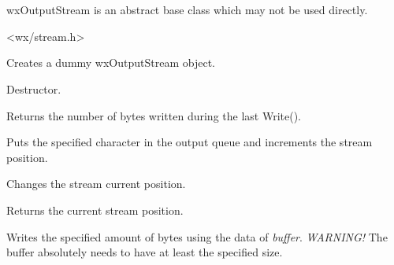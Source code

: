 \section{}\label{wxoutputstream}

wxOutputStream is an abstract base class which may not be used directly.




<wx/stream.h>



Creates a dummy wxOutputStream object.



Destructor.



Returns the number of bytes written during the last Write().



Puts the specified character in the output queue and increments the
stream position.



Changes the stream current position.



Returns the current stream position.



Writes the specified amount of bytes using the data of {\it buffer}. 
{\it WARNING!} The buffer absolutely needs to have at least the specified size.

